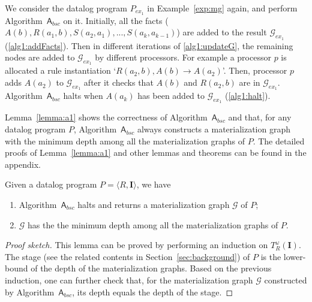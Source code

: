 \documentclass[final,1p,times]{elsarticle}
\begin{document}
\begin{example}
We consider the datalog program $P_{ex_1}$ in Example~\ref{exp:mg} again,
and perform Algorithm~$\mathsf{A}_{bsc}$ on it.
Initially, all the facts ($A(b),R(a_1,b),S(a_2,a_1),...,S(a_{k},a_{k-1})$) are added to the
result $\mathcal{G}_{ex_1}$ (\ref{alg1:addFacts}).
Then in different iterations of \ref{alg1:updateG}, the remaining nodes are added to
$\mathcal{G}_{ex_1}$ by different processors.
For example a processor $p$ is allocated a rule instantiation `$R(a_2,b),A(b)\rightarrow A(a_2)$'.
Then, processor $p$ adds $A(a_2)$ to $\mathcal{G}_{ex_1}$ after it checks that
$A(b)$ and $R(a_2,b)$ are in $\mathcal{G}_{ex_1}$.
Algorithm~$\mathsf{A}_{bsc}$ halts when $A(a_k)$ has been added to $\mathcal{G}_{ex_1}$ (\ref{alg1:halt}).
\end{example}

Lemma~\ref{lemma:a1} shows the correctness of Algorithm~$\mathsf{A}_{bsc}$ and that, for any datalog program $P$,
Algorithm~$\mathsf{A}_{bsc}$ always constructs a materialization graph with the minimum depth among all the
materialization graphs of $P$. The detailed proofs of Lemma~\ref{lemma:a1} and other lemmas and theorems can be found
in the appendix.

\begin{lemma}
\label{lemma:a1}
Given a datalog program $P=\langle R, \textbf{I}\rangle$, we have
\begin{enumerate}[leftmargin=4ex]
\item Algorithm~$\mathsf{A}_{bsc}$ halts and returns a materialization graph $\mathcal{G}$ of $P$;
\item $\mathcal{G}$ has the the minimum depth among all the materialization graphs of $P$.
\end{enumerate}
\end{lemma}

\begin{proof}[Proof sketch] This lemma can be proved by performing
an induction on $T_R^{\omega}(\textbf{I})$.
The stage (see the related contents in Section~\ref{sec:background}) of $P$
is the lower-bound of the depth of the materialization graphs. Based on the previous induction,
one can further check that, for the materialization graph $\mathcal{G}$ constructed by Algorithm~$\mathsf{A}_{bsc}$,
its depth equals the depth of the stage.
\end{proof}
\end{document}
